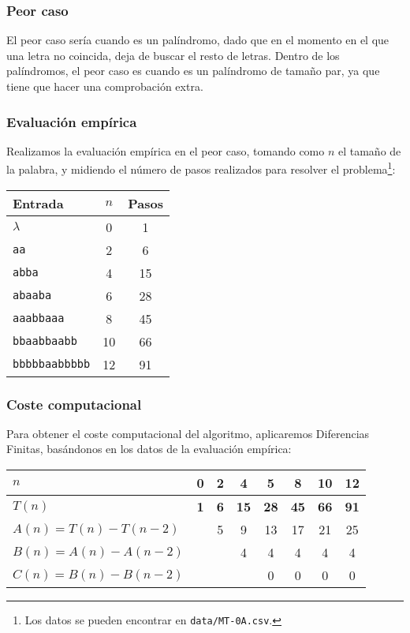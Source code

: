 \subsubsection*{Peor caso}
El peor caso sería cuando es un palíndromo, dado que en el momento en el que una letra no coincida, deja de buscar el resto de letras. Dentro de los palíndromos, el peor caso es cuando es un palíndromo de tamaño par, ya que tiene que hacer una comprobación extra.

\subsubsection*{Evaluación empírica}
Realizamos la evaluación empírica en el peor caso, tomando como $n$ el tamaño de la palabra, y midiendo el número de pasos realizados para resolver el problema\footnote{Los datos se pueden encontrar en \texttt{data/MT-0A.csv}.}:

\begin{table}[h]
    \centering
    \begin{tabular}{lcc}
        Entrada & $n$ & Pasos \\
        \hline
        $\lambda$               & 0  & 1  \\
        \texttt{aa}             & 2  & 6  \\
        \texttt{abba}           & 4  & 15 \\
        \texttt{abaaba}         & 6  & 28 \\
        \texttt{aaabbaaa}       & 8  & 45 \\
        \texttt{bbaabbaabb}     & 10 & 66 \\
        \texttt{bbbbbaabbbbb}   & 12 & 91
    \end{tabular}
\end{table}


\subsubsection*{Coste computacional}
Para obtener el coste computacional del algoritmo, aplicaremos Diferencias Finitas, basándonos en los datos de la evaluación empírica:

\begin{table}[H]
    \centering
    \begin{tabular}{|l|c|c|c|c|c|c|c|}
        \hline
        $n$ & \textbf{0} & \textbf{2} & \textbf{4} & \textbf{5} & \textbf{8} & \textbf{10} & \textbf{12} \\ \hline
        $T(n)$ & \textbf{1} & \textbf{6} & \textbf{15} & \textbf{28} & \textbf{45} & \textbf{66} & \textbf{91} \\ \hline
        \hline
        $A(n) = T(n) - T(n-2)$ &    &  5 &  9 & 13 & 17 & 21 & 25 \\ \hline
        $B(n) = A(n) - A(n-2)$ &    &    &  4 &  4 &  4 &  4 &  4 \\ \hline
        $C(n) = B(n) - B(n-2)$ &    &    &    &  0 &  0 &  0 &  0 \\ \hline
    \end{tabular}
    \label{tab:0A}
\end{table}


